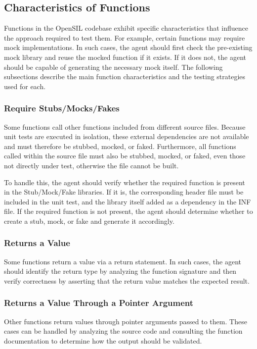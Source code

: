 \documentclass[conference]{IEEEtran}
\begin{document}
\subsection{Characteristics of Functions}
Functions in the OpenSIL codebase exhibit specific characteristics that influence the approach required to test them. For example, certain functions may require mock implementations. In such cases, the agent should first check the pre-existing mock library and reuse the mocked function if it exists. If it does not, the agent should be capable of generating the necessary mock itself. The following subsections describe the main function characteristics and the testing strategies used for each.

\subsubsection*{\textbf{Require Stubs/Mocks/Fakes}}
Some functions call other functions included from different source files. Because unit tests are executed in isolation, these external dependencies are not available and must therefore be stubbed, mocked, or faked. Furthermore, all functions called within the source file must also be stubbed, mocked, or faked, even those not directly under test, otherwise the file cannot be built.  

To handle this, the agent should verify whether the required function is present in the Stub/Mock/Fake libraries. If it is, the corresponding header file must be included in the unit test, and the library itself added as a dependency in the INF file. If the required function is not present, the agent should determine whether to create a stub, mock, or fake and generate it accordingly.

\subsubsection*{\textbf{Returns a Value}}
Some functions return a value via a return statement. In such cases, the agent should identify the return type by analyzing the function signature and then verify correctness by asserting that the return value matches the expected result.

\subsubsection*{\textbf{Returns a Value Through a Pointer Argument}}
Other functions return values through pointer arguments passed to them. These cases can be handled by analyzing the source code and consulting the function documentation to determine how the output should be validated.
\end{document}
